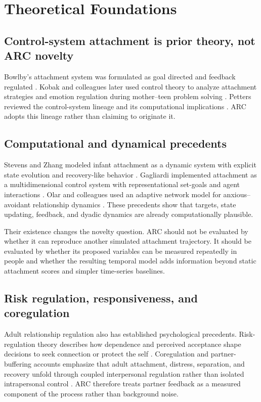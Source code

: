 \section{Theoretical Foundations}

\subsection{Control-system attachment is prior theory, not ARC novelty}

Bowlby's attachment system was formulated as goal directed and feedback regulated \parencite{bowlby1982attachment}. Kobak and colleagues later used control theory to analyze attachment strategies and emotion regulation during mother--teen problem solving \parencite{kobak1993control}. Petters reviewed the control-system lineage and its computational implications \parencite{petters2019control}. ARC adopts this lineage rather than claiming to originate it.

\subsection{Computational and dynamical precedents}

Stevens and Zhang modeled infant attachment as a dynamic system with explicit state evolution and recovery-like behavior \parencite{stevens2009dynamic}. Gagliardi implemented attachment as a multidimensional control system with representational set-goals and agent interactions \parencite{gagliardi2022control}. Olar and colleagues used an adaptive network model for anxious--avoidant relationship dynamics \parencite{olar2026relationship}. These precedents show that targets, state updating, feedback, and dyadic dynamics are already computationally plausible.

Their existence changes the novelty question. ARC should not be evaluated by whether it can reproduce another simulated attachment trajectory. It should be evaluated by whether its proposed variables can be measured repeatedly in people and whether the resulting temporal model adds information beyond static attachment scores and simpler time-series baselines.

\subsection{Risk regulation, responsiveness, and coregulation}

Adult relationship regulation also has established psychological precedents. Risk-regulation theory describes how dependence and perceived acceptance shape decisions to seek connection or protect the self \parencite{murray2006risk}. Coregulation and partner-buffering accounts emphasize that adult attachment, distress, separation, and recovery unfold through coupled interpersonal regulation rather than isolated intrapersonal control \parencite{sbarra2008coregulation,simpson2014buffering,overall2022buffering}. ARC therefore treats partner feedback as a measured component of the process rather than background noise.

